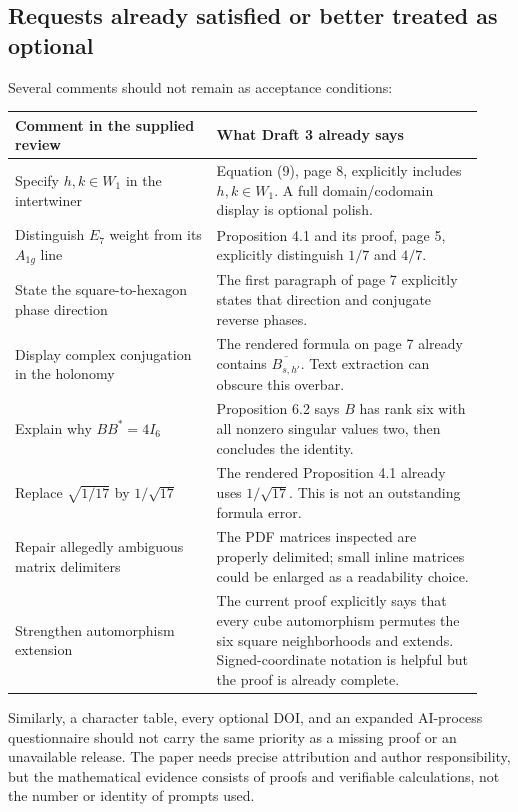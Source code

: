 \documentclass[11pt,a4paper]{article}
\begin{document}
\subsection{Requests already satisfied or better treated as optional}
Several comments should not remain as acceptance conditions:
\begin{longtable}{>{\raggedright\arraybackslash}p{0.40\linewidth}>{\raggedright\arraybackslash}p{0.53\linewidth}}
\toprule
Comment in the supplied review & What Draft 3 already says\\\midrule
\endhead
Specify $h,k\in W_1$ in the intertwiner & Equation (9), page 8, explicitly includes $h,k\in W_1$. A full domain/codomain display is optional polish.\\
Distinguish $E_7$ weight from its $A_{1g}$ line & Proposition 4.1 and its proof, page 5, explicitly distinguish $1/7$ and $4/7$.\\
State the square-to-hexagon phase direction & The first paragraph of page 7 explicitly states that direction and conjugate reverse phases.\\
Display complex conjugation in the holonomy & The rendered formula on page 7 already contains $\overline{B_{s,h'}}$. Text extraction can obscure this overbar.\\
Explain why $BB^*=4I_6$ & Proposition 6.2 says $B$ has rank six with all nonzero singular values two, then concludes the identity.\\
Replace $\sqrt{1/17}$ by $1/\sqrt{17}$ & The rendered Proposition 4.1 already uses $1/\sqrt{17}$. This is not an outstanding formula error.\\
Repair allegedly ambiguous matrix delimiters & The PDF matrices inspected are properly delimited; small inline matrices could be enlarged as a readability choice.\\
Strengthen automorphism extension & The current proof explicitly says that every cube automorphism permutes the six square neighborhoods and extends. Signed-coordinate notation is helpful but the proof is already complete.\\\bottomrule
\end{longtable}
Similarly, a character table, every optional DOI, and an expanded AI-process questionnaire should not carry the same priority as a missing proof or an unavailable release. The paper needs precise attribution and author responsibility, but the mathematical evidence consists of proofs and verifiable calculations, not the number or identity of prompts used.
\end{document}
